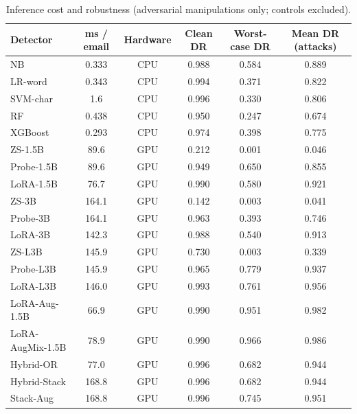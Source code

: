 \begin{table}[t]
\centering
\caption{Inference cost and robustness (adversarial manipulations only; controls excluded).}
\label{tab:cost}
\footnotesize
\begin{tabular}{lccccc}
\toprule
\textbf{Detector} & \textbf{ms / email} & \textbf{Hardware} & \textbf{Clean DR} & \textbf{Worst-case DR} & \textbf{Mean DR (attacks)} \\
\midrule
NB & 0.333 & CPU & 0.988 & 0.584 & 0.889 \\
LR-word & 0.343 & CPU & 0.994 & 0.371 & 0.822 \\
SVM-char & 1.6 & CPU & 0.996 & 0.330 & 0.806 \\
RF & 0.438 & CPU & 0.950 & 0.247 & 0.674 \\
XGBoost & 0.293 & CPU & 0.974 & 0.398 & 0.775 \\
ZS-1.5B & 89.6 & GPU & 0.212 & 0.001 & 0.046 \\
Probe-1.5B & 89.6 & GPU & 0.949 & 0.650 & 0.855 \\
LoRA-1.5B & 76.7 & GPU & 0.990 & 0.580 & 0.921 \\
ZS-3B & 164.1 & GPU & 0.142 & 0.003 & 0.041 \\
Probe-3B & 164.1 & GPU & 0.963 & 0.393 & 0.746 \\
LoRA-3B & 142.3 & GPU & 0.988 & 0.540 & 0.913 \\
ZS-L3B & 145.9 & GPU & 0.730 & 0.003 & 0.339 \\
Probe-L3B & 145.9 & GPU & 0.965 & 0.779 & 0.937 \\
LoRA-L3B & 146.0 & GPU & 0.993 & 0.761 & 0.956 \\
LoRA-Aug-1.5B & 66.9 & GPU & 0.990 & 0.951 & 0.982 \\
LoRA-AugMix-1.5B & 78.9 & GPU & 0.990 & 0.966 & 0.986 \\
Hybrid-OR & 77.0 & GPU & 0.996 & 0.682 & 0.944 \\
Hybrid-Stack & 168.8 & GPU & 0.996 & 0.682 & 0.944 \\
Stack-Aug & 168.8 & GPU & 0.996 & 0.745 & 0.951 \\
\bottomrule
\end{tabular}
\end{table}